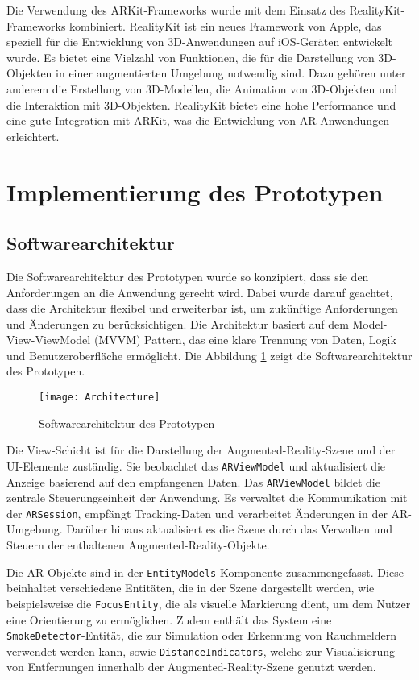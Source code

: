 Die Verwendung des ARKit-Frameworks wurde mit dem Einsatz des RealityKit-Frameworks kombiniert. RealityKit ist ein neues Framework von Apple, das speziell für die Entwicklung von 3D-Anwendungen auf iOS-Geräten entwickelt wurde. Es bietet eine Vielzahl von Funktionen, die für die Darstellung von 3D-Objekten in einer augmentierten Umgebung notwendig sind. Dazu gehören unter anderem die Erstellung von 3D-Modellen, die Animation von 3D-Objekten und die Interaktion mit 3D-Objekten. RealityKit bietet eine hohe Performance und eine gute Integration mit ARKit, was die Entwicklung von AR-Anwendungen erleichtert.

\section{Implementierung des Prototypen}

\subsection{Softwarearchitektur}

Die Softwarearchitektur des Prototypen wurde so konzipiert, dass sie den Anforderungen an die Anwendung gerecht wird. Dabei wurde darauf geachtet, dass die Architektur flexibel und erweiterbar ist, um zukünftige Anforderungen und Änderungen zu berücksichtigen. Die Architektur basiert auf dem Model-View-ViewModel (MVVM) Pattern, das eine klare Trennung von Daten, Logik und Benutzeroberfläche ermöglicht. Die Abbildung \ref{fig:Architecture} zeigt die Softwarearchitektur des Prototypen.

\begin{figure}[ht]
    \centering
    \texttt{[image: Architecture]}
    \caption{Softwarearchitektur des Prototypen}
    \label{fig:Architecture}
\end{figure}

Die View-Schicht ist für die Darstellung der Augmented-Reality-Szene und der UI-Elemente zuständig. Sie beobachtet das \texttt{ARViewModel} und aktualisiert die Anzeige basierend auf den empfangenen Daten. Das \texttt{ARViewModel} bildet die zentrale Steuerungseinheit der Anwendung. Es verwaltet die Kommunikation mit der \texttt{ARSession}, empfängt Tracking-Daten und verarbeitet Änderungen in der AR-Umgebung. Darüber hinaus aktualisiert es die Szene durch das Verwalten und Steuern der enthaltenen Augmented-Reality-Objekte.

Die AR-Objekte sind in der \texttt{EntityModels}-Komponente zusammengefasst. Diese beinhaltet verschiedene Entitäten, die in der Szene dargestellt werden, wie beispielsweise die \texttt{FocusEntity}, die als visuelle Markierung dient, um dem Nutzer eine Orientierung zu ermöglichen. Zudem enthält das System eine \texttt{SmokeDetector}-Entität, die zur Simulation oder Erkennung von Rauchmeldern verwendet werden kann, sowie \texttt{DistanceIndicators}, welche zur Visualisierung von Entfernungen innerhalb der Augmented-Reality-Szene genutzt werden.

